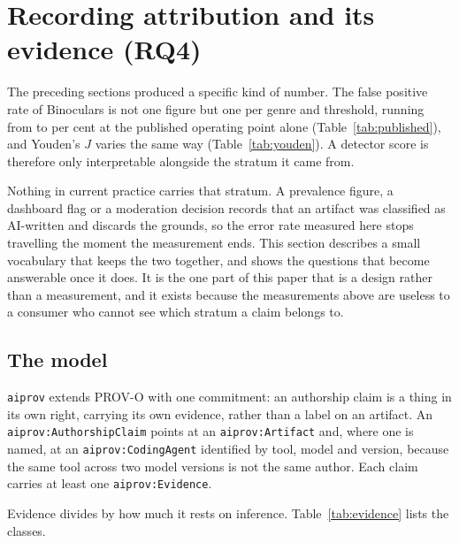 \section{Recording attribution and its evidence (RQ4)}
\label{sec:provenance}

The preceding sections produced a specific kind of number. The false positive rate of
Binoculars is not one figure but one per genre and threshold, running from
\PublishedBinoMinFpr{} to \PublishedBinoMaxFpr{} per cent at the published operating
point alone (Table~\ref{tab:published}), and Youden's $J$ varies the same way
(Table~\ref{tab:youden}). A detector score is therefore only interpretable alongside the
stratum it came from.

Nothing in current practice carries that stratum. A prevalence figure, a dashboard flag
or a moderation decision records that an artifact was classified as AI-written and
discards the grounds, so the error rate measured here stops travelling the moment the
measurement ends. This section describes a small vocabulary that keeps the two together,
and shows the questions that become answerable once it does. It is the one part of this
paper that is a design rather than a measurement, and it exists because the measurements
above are useless to a consumer who cannot see which stratum a claim belongs to.

\subsection{The model}
\label{sec:provenance:model}

\texttt{aiprov} extends PROV-O \citep{lebo2013provo} with one commitment: an authorship
claim is a thing in its own right, carrying its own evidence, rather than a label on an
artifact. An \texttt{aiprov:AuthorshipClaim} points at an \texttt{aiprov:Artifact} and,
where one is named, at an \texttt{aiprov:CodingAgent} identified by tool, model and
version, because the same tool across two model versions is not the same author. Each
claim carries at least one \texttt{aiprov:Evidence}.

Evidence divides by how much it rests on inference. Table~\ref{tab:evidence} lists the
classes.

